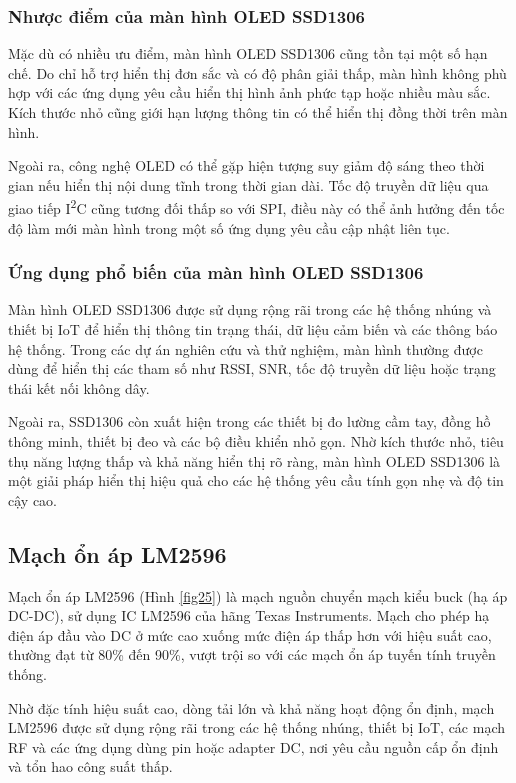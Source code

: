 \documentclass{article}
\begin{document}
	\subsubsection{Nhược điểm của màn hình OLED SSD1306}
	
	Mặc dù có nhiều ưu điểm, màn hình OLED SSD1306 cũng tồn tại một số hạn chế. Do chỉ hỗ trợ hiển thị đơn sắc và có độ phân giải thấp, màn hình không phù hợp với các ứng dụng yêu cầu hiển thị hình ảnh phức tạp hoặc nhiều màu sắc. Kích thước nhỏ cũng giới hạn lượng thông tin có thể hiển thị đồng thời trên màn hình.
	
	Ngoài ra, công nghệ OLED có thể gặp hiện tượng suy giảm độ sáng theo thời gian nếu hiển thị nội dung tĩnh trong thời gian dài. Tốc độ truyền dữ liệu qua giao tiếp I\textsuperscript{2}C cũng tương đối thấp so với SPI, điều này có thể ảnh hưởng đến tốc độ làm mới màn hình trong một số ứng dụng yêu cầu cập nhật liên tục.
	
	\subsubsection{Ứng dụng phổ biến của màn hình OLED SSD1306}
	
	Màn hình OLED SSD1306 được sử dụng rộng rãi trong các hệ thống nhúng và thiết bị IoT để hiển thị thông tin trạng thái, dữ liệu cảm biến và các thông báo hệ thống. Trong các dự án nghiên cứu và thử nghiệm, màn hình thường được dùng để hiển thị các tham số như RSSI, SNR, tốc độ truyền dữ liệu hoặc trạng thái kết nối không dây.
	
	Ngoài ra, SSD1306 còn xuất hiện trong các thiết bị đo lường cầm tay, đồng hồ thông minh, thiết bị đeo và các bộ điều khiển nhỏ gọn. Nhờ kích thước nhỏ, tiêu thụ năng lượng thấp và khả năng hiển thị rõ ràng, màn hình OLED SSD1306 là một giải pháp hiển thị hiệu quả cho các hệ thống yêu cầu tính gọn nhẹ và độ tin cậy cao.
	
	\subsection{Mạch ổn áp LM2596}
	
	Mạch ổn áp LM2596 (Hình \ref{fig25}) là mạch nguồn chuyển mạch kiểu buck (hạ áp DC-DC), sử dụng IC LM2596 của hãng Texas Instruments. Mạch cho phép hạ điện áp đầu vào DC ở mức cao xuống mức điện áp thấp hơn với hiệu suất cao, thường đạt từ 80\% đến 90\%, vượt trội so với các mạch ổn áp tuyến tính truyền thống.
	
	Nhờ đặc tính hiệu suất cao, dòng tải lớn và khả năng hoạt động ổn định, mạch LM2596 được sử dụng rộng rãi trong các hệ thống nhúng, thiết bị IoT, các mạch RF và các ứng dụng dùng pin hoặc adapter DC, nơi yêu cầu nguồn cấp ổn định và tổn hao công suất thấp.
	
\end{document}
